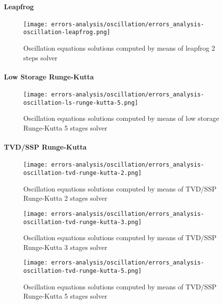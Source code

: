\documentclass[pdftex,preprint,3p,times,numbers]{elsarticle}
\begin{document}
\paragraph{Leapfrog}

\begin{figure}[!ht]
  \centering
  \texttt{[image: errors-analysis/oscillation/errors\_analysis-oscillation-leapfrog.png]}
  \caption{Oscillation equations solutions computed by means of leapfrog 2 steps solver}\label{fig:results-oscillation-leapfrog}
\end{figure}

\paragraph{Low Storage Runge-Kutta}

\begin{figure}[!ht]
  \centering
  \texttt{[image: errors-analysis/oscillation/errors\_analysis-oscillation-ls-runge-kutta-5.png]}
  \caption{Oscillation equations solutions computed by means of low storage Runge-Kutta 5 stages solver}\label{fig:results-oscillation-ls-runge-kutta-5}
\end{figure}

\paragraph{TVD/SSP Runge-Kutta}

\begin{figure}[!ht]
  \centering
  \texttt{[image: errors-analysis/oscillation/errors\_analysis-oscillation-tvd-runge-kutta-2.png]}
  \caption{Oscillation equations solutions computed by means of TVD/SSP Runge-Kutta 2 stages solver}\label{fig:results-oscillation-tvd-runge-kutta-2}
\end{figure}

\begin{figure}[!ht]
  \centering
  \texttt{[image: errors-analysis/oscillation/errors\_analysis-oscillation-tvd-runge-kutta-3.png]}
  \caption{Oscillation equations solutions computed by means of TVD/SSP Runge-Kutta 3 stages solver}\label{fig:results-oscillation-tvd-runge-kutta-3}
\end{figure}

\begin{figure}[!ht]
  \centering
  \texttt{[image: errors-analysis/oscillation/errors\_analysis-oscillation-tvd-runge-kutta-5.png]}
  \caption{Oscillation equations solutions computed by means of TVD/SSP Runge-Kutta 5 stages solver}\label{fig:results-oscillation-tvd-runge-kutta-5}
\end{figure}
\end{document}

